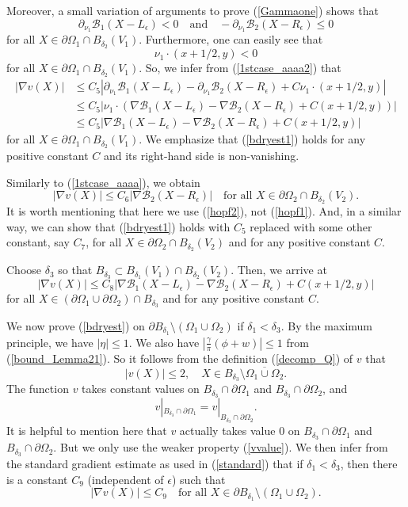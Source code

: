 \documentclass[11pt,a4paper]{article}
\numberwithin{equation}{section}
\newcommand{\p}{\partial}
\newcommand{\eqnref}[1]{(\ref {#1})}
\newcommand{\Bcal}{\mathcal{B}}
\newcommand{\Gd}{\delta}
\newcommand{\Ge}{\epsilon}
\newcommand{\Gf}{\phi}
\newcommand{\Gg}{\gamma}
\newcommand{\Gn}{\eta}
\newcommand{\GO}{\Omega}
\newcommand{\beq}{\begin{equation}}
\newcommand{\eeq}{\end{equation}}
\begin{document}
Moreover, a small variation of arguments to prove \eqnref{Gammaone} shows that
\beq
\p_{\nu_1} \Bcal_1 (X-L_\Ge) <0 \quad\mbox{and}\quad -\p_{\nu_1}\Bcal_2(X-R_\Ge) \leq 0
\eeq
for all $X \in \p\GO_1 \cap B_{\Gd_2} (V_1)$. Furthermore, one can easily see that
\beq
\nu_1 \cdot \left(x + 1/2 ,y\right) <0
\eeq
for all $X \in \p\GO_1 \cap B_{\Gd_2} (V_1)$. So, we infer from \eqnref{1stcase_aaaa2} that
\begin{align}
|\nabla  v (X)| & \leq C_5 \left| \p_{\nu_1} \Bcal_1 (X-L_\Ge) -  \p_{\nu_1} \Bcal_2 (X - R_\Ge) + C \nu_1 \cdot \left(x + 1/2, y\right) \right | \nonumber \\
&\leq C_5 \left| \nu_1 \cdot \left( \nabla\Bcal_1 (X-L_\Ge) -  \nabla \Bcal_2 (X - R_\Ge) + C \left(x + 1/2, y\right) \right) \right | \nonumber \\
& \leq C_5 \left| \nabla \Bcal_1 (X-L_\Ge) - \nabla \Bcal_2 (X - R_\Ge) + C \left(x + 1/2, y\right) \right | \label{bdryest1}
\end{align}
for all $X \in \p {\GO_1} \cap B_{\Gd_2} (V_1)$.
We emphasize that \eqnref{bdryest1} holds for any positive constant $C$ and its right-hand side is non-vanishing.

Similarly to \eqnref{1stcase_aaaa}, we obtain
\beq\label{2ndcase_aaaa}
|\nabla  v (X)| \leq C_6 \left| \nabla \Bcal_2\left ( X-R_\Ge \right)\right |   \quad\mbox {for all }  X \in \p { \GO_2} \cap B_{\Gd_2} (V_2).
\eeq
It is worth mentioning that here we use \eqnref{hopf2}, not \eqnref{hopf1}. And, in a similar way, we can show that \eqnref{bdryest1} holds with $C_5$ replaced with some other constant, say $C_7$, for all $X \in \p {\GO_2} \cap B_{\Gd_2}(V_2)$ and for any positive constant $C$.

Choose $\Gd_3$ so that $B_{\Gd_3} \subset B_{\Gd_1} (V_1) \cap B_{\Gd_2} (V_2)$. Then, we arrive at
\beq\label{bdryest4}
|\nabla  v (X)| \leq C_8 \left| \nabla \Bcal_1 (X-L_\Ge) - \nabla \Bcal_2 (X - R_\Ge) + C \left(x + 1/2, y\right) \right |
\eeq
for all $X \in (\p\GO_1 \cup \p\GO_2) \cap B_{\Gd_3}$ and for any positive constant $C$.


We now prove \eqnref{bdryest} on $\p B_{\Gd_1} \setminus (\GO_1 \cup \GO_2)$ if $\Gd_1<\Gd_3$.
By the maximum principle, we have $|\Gn| \le 1$. We also have $|\frac{\Gg}{\pi}(\Gf + w)| \le 1$ from \eqnref{bound_Lemma21}. So it follows from the definition \eqnref{decomp_Q} of $v$ that
\beq
|v(X)| \le 2, \quad X \in B_{\Gd_3} \setminus \overline{\GO_1 \cup \GO_2}.
\eeq
The function $v$ takes constant values on $B_{\Gd_3} \cap \p\GO_1$ and $B_{\Gd_3} \cap \p\GO_2$, and
\beq\label{vvalue}
v|_{B_{\Gd_3} \cap \p\GO_1}= v|_{B_{\Gd_3} \cap \p\GO_2}.
\eeq
It is helpful to mention here that $v$ actually takes value $0$ on $B_{\Gd_3} \cap \p\GO_1$ and $B_{\Gd_3} \cap \p\GO_2$. But we only use the weaker property \eqnref{vvalue}.
We then infer from the standard gradient estimate as used in \eqnref{standard} that if $\Gd_1<\Gd_3$, then there is a constant $C_9$ (independent of $\Ge$) such that
\beq\label{3rdcase_aaaa}
|\nabla  v (X)| \leq C_9 \quad\mbox{for all } X \in \p B_{\Gd_1} \setminus (\GO_1 \cup \GO_2).
\eeq
\end{document}
